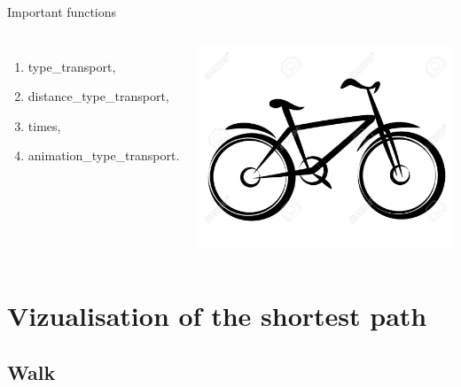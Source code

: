 \documentclass[11pt, compress]{beamer}
\theoremstyle{definition}
\begin{document}
\begin{frame}{Important functions}
\begin{columns}
          \begin{enumerate}[label=$\bullet$]
               \item<1-> type\_transport,
               \item<2-> distance\_type\_transport,
               \item<3-> times, 
               \item<4-> animation\_type\_transport.
           \end{enumerate}
           \centering
             \includegraphics[scale=.3]{logo_bike.jpg}
         \end{columns} 
\end{frame}


\section[Visu]{Vizualisation of the shortest path}
\subsection{Walk}
\end{document}
